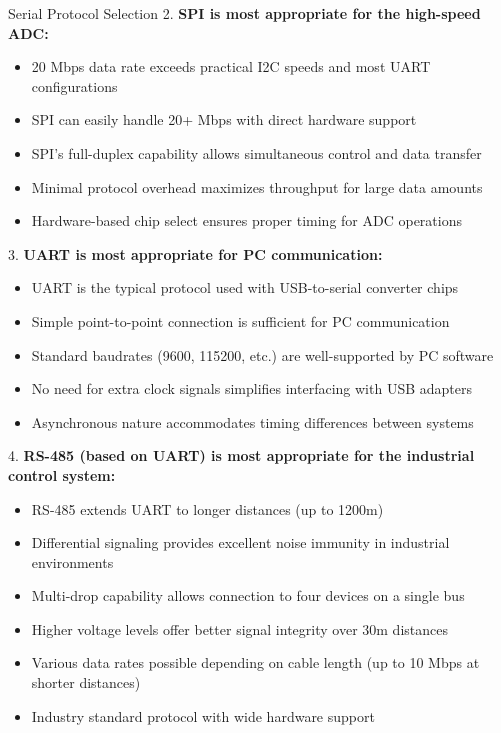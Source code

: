 \begin{example2}{Serial Protocol Selection}
2. \textbf{SPI is most appropriate for the high-speed ADC:}
   \begin{itemize}
     \item 20 Mbps data rate exceeds practical I2C speeds and most UART configurations
     \item SPI can easily handle 20+ Mbps with direct hardware support
     \item SPI's full-duplex capability allows simultaneous control and data transfer
     \item Minimal protocol overhead maximizes throughput for large data amounts
     \item Hardware-based chip select ensures proper timing for ADC operations
   \end{itemize}

3. \textbf{UART is most appropriate for PC communication:}
   \begin{itemize}
     \item UART is the typical protocol used with USB-to-serial converter chips
     \item Simple point-to-point connection is sufficient for PC communication
     \item Standard baudrates (9600, 115200, etc.) are well-supported by PC software
     \item No need for extra clock signals simplifies interfacing with USB adapters
     \item Asynchronous nature accommodates timing differences between systems
   \end{itemize}

4. \textbf{RS-485 (based on UART) is most appropriate for the industrial control system:}
   \begin{itemize}
     \item RS-485 extends UART to longer distances (up to 1200m)
     \item Differential signaling provides excellent noise immunity in industrial environments
     \item Multi-drop capability allows connection to four devices on a single bus
     \item Higher voltage levels offer better signal integrity over 30m distances
     \item Various data rates possible depending on cable length (up to 10 Mbps at shorter distances)
     \item Industry standard protocol with wide hardware support
   \end{itemize}
\end{example2}
    